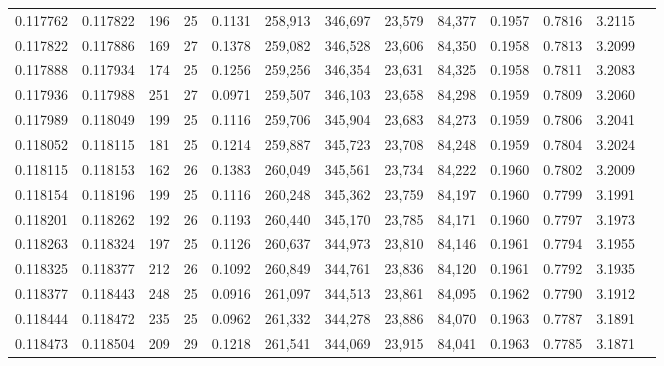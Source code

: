 \begin{tabular}{rrrrrrrrrrrrr}
0.117762 & 0.117822 & 196 &  25 &                                     0.1131 & 258,913 & 346,697 &  23,579 &  84,377 & 0.1957 & 0.7816 & 3.2115 \\
0.117822 & 0.117886 & 169 &  27 &                                     0.1378 & 259,082 & 346,528 &  23,606 &  84,350 & 0.1958 & 0.7813 & 3.2099 \\
0.117888 & 0.117934 & 174 &  25 &                                     0.1256 & 259,256 & 346,354 &  23,631 &  84,325 & 0.1958 & 0.7811 & 3.2083 \\
0.117936 & 0.117988 & 251 &  27 &                                     0.0971 & 259,507 & 346,103 &  23,658 &  84,298 & 0.1959 & 0.7809 & 3.2060 \\
0.117989 & 0.118049 & 199 &  25 &                                     0.1116 & 259,706 & 345,904 &  23,683 &  84,273 & 0.1959 & 0.7806 & 3.2041 \\
0.118052 & 0.118115 & 181 &  25 &                                     0.1214 & 259,887 & 345,723 &  23,708 &  84,248 & 0.1959 & 0.7804 & 3.2024 \\
0.118115 & 0.118153 & 162 &  26 &                                     0.1383 & 260,049 & 345,561 &  23,734 &  84,222 & 0.1960 & 0.7802 & 3.2009 \\
0.118154 & 0.118196 & 199 &  25 &                                     0.1116 & 260,248 & 345,362 &  23,759 &  84,197 & 0.1960 & 0.7799 & 3.1991 \\
0.118201 & 0.118262 & 192 &  26 &                                     0.1193 & 260,440 & 345,170 &  23,785 &  84,171 & 0.1960 & 0.7797 & 3.1973 \\
0.118263 & 0.118324 & 197 &  25 &                                     0.1126 & 260,637 & 344,973 &  23,810 &  84,146 & 0.1961 & 0.7794 & 3.1955 \\
0.118325 & 0.118377 & 212 &  26 &                                     0.1092 & 260,849 & 344,761 &  23,836 &  84,120 & 0.1961 & 0.7792 & 3.1935 \\
0.118377 & 0.118443 & 248 &  25 &                                     0.0916 & 261,097 & 344,513 &  23,861 &  84,095 & 0.1962 & 0.7790 & 3.1912 \\
0.118444 & 0.118472 & 235 &  25 &                                     0.0962 & 261,332 & 344,278 &  23,886 &  84,070 & 0.1963 & 0.7787 & 3.1891 \\
0.118473 & 0.118504 & 209 &  29 &                                     0.1218 & 261,541 & 344,069 &  23,915 &  84,041 & 0.1963 & 0.7785 & 3.1871 \\

\end{tabular}
